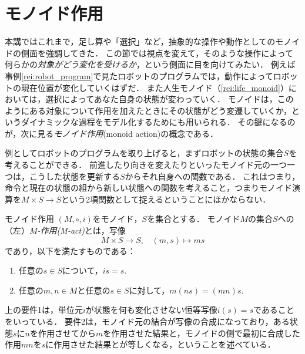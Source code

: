 \documentclass[11pt,a4paper, dvipdfmx]{jsarticle}
\begin{document}
\section{モノイド作用}
本講ではこれまで，足し算や「選択」など，抽象的な操作や動作としてのモノイドの側面を強調してきた．
この節では視点を変えて，そのような操作によって何らかの\emph{対象がどう変化を受けるか}，という側面に目を向けてみたい．
例えば事例\ref{rei:robot_program}で見たロボットのプログラムでは，動作によってロボットの現在位置が変化していくはずだ．
また人生モノイド（\ref{rei:life_monoid}）においては，選択によってあなた自身の状態が変わっていく．
モノイドは，このようにある対象について作用を加えたときにその状態がどう変遷していくか，というダイナミックな過程をモデル化するためにも用いられる．
その鍵になるのが，次に見る\emph{モノイド作用}(monoid action)の概念である．

例としてロボットのプログラムを取り上げると，まずロボットの状態の集合$S$を考えることができる．
前進したり向きを変えたりといったモノイド元の一つ一つは，こうした状態を更新する$S$からそれ自身への関数である．
これはつまり，命令と現在の状態の組から新しい状態への関数を考えること，つまりモノイド演算を$M \times S \to S$という2項関数として捉えるということにほかならない．

\begin{dfn}{モノイド作用}{}
 $(M, \circ, i)$をモノイド，$S$を集合とする．
 モノイド$M$の集合$S$への（左）\emph{$M$-作用(M-act)}とは，写像
 \[
  M \times S \to S, \ \ \ \ (m, s) \mapsto ms
 \]
 であり，以下を満たすものである：
 \begin{enumerate}
  \item 任意の$s \in S$について，$is = s$.
  \item 任意の$m, n \in M$と任意の$s \in S$に対して，$m(ns) = (mn)s$.
 \end{enumerate}
\end{dfn}
上の要件1は，単位元$i$が状態を何も変化させない恒等写像$i(s)=s$であることをいっている．
要件2は，モノイド元の結合が写像の合成になっており，ある状態$s$に$n$を作用させてから$m$を作用させた結果と，モノイドの側で最初に合成した作用$mn$を$s$に作用させた結果とが等しくなる，ということを述べている．
\end{document}
